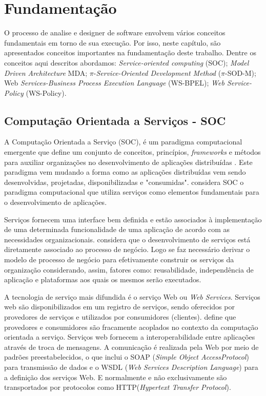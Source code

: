 \chapter{Fundamentação}
\label{background}
O processo de analise e designer de software envolvem vários conceitos fundamentais em torno de sua execução. Por isso, neste capítulo, são apresentados conceitos importantes na fundamentação deste trabalho. Dentre os conceitos aqui descritos abordamos: \textit{Service-oriented computing} (SOC); \textit{Model Driven Architecture} MDA; $\pi$-\textit{Service-Oriented Development Method} ($\pi$-SOD-M); Web \textit{Services-Business Process Execution Language} (WS-BPEL); \textit{Web Service-Policy} (WS-Policy).

\section{Computação Orientada a Serviços - SOC}
\label{semioticEngineering}

A Computação Orientada a Serviço (SOC), é um paradigma computacional emergente que define um conjunto de conceitos, princípios, \textit{frameworks} e métodos para auxiliar organizações no desenvolvimento de aplicações distribuídas \cite{papazoglou_et_al:2006}. Este paradigma vem mudando a forma como as aplicações distribuídas vem sendo desenvolvidas, projetadas, disponibilizadas e "consumidas". \cite{Papazoglou:2003} considera SOC o paradigma computacional que utiliza serviços como elementos fundamentais para o desenvolvimento de aplicações. 

Serviços fornecem uma interface bem definida e estão associados à implementação de uma determinada funcionalidade de uma aplicação de acordo com as necessidades organizacionais. \cite{PapazoglouHeuvel:2006} considera que o desenvolvimento de serviços está diretamente associado ao processo de negócio. Logo se faz necessário derivar o modelo de processo de negócio para efetivamente construir os serviços da organização considerando, assim, fatores como: reusabilidade, independência de aplicação e plataformas aos quais os mesmos serão executados.

A tecnologia de serviço mais difundida é o serviço Web ou \textit{Web Services}. Serviços web são disponibilizados em um registro de serviços, sendo oferecidos por provedores de serviços e utilizados por consumidores (clientes). \cite{PapazoglouHeuvel:2007} define que provedores e consumidores são fracamente acoplados no contexto da computação orientada a serviço. Serviços web fornecem a interoperabilidade entre aplicações através de troca de mensagens. A comunicação é realizada pela Web por meio de padrões preestabelecidos, o que inclui o SOAP (\textit{Simple Object AccessProtocol}) para transmissão de dados e o WSDL (\textit{Web Services Description Language}) para a definição dos serviços Web. E normalmente e não exclusivamente são transportados por protocolos como HTTP(\textit{Hypertext Transfer Protocol}).

